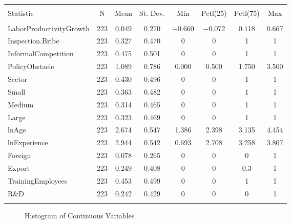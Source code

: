 \begin{table}[!htbp] \centering 
  \caption*{}  
\begin{tabular}{@{\extracolsep{5pt}}lccccccc} 
\\[-1.8ex]\hline 
\hline \\[-1.8ex] 
Statistic & \multicolumn{1}{c}{N} & \multicolumn{1}{c}{Mean} & \multicolumn{1}{c}{St. Dev.} & \multicolumn{1}{c}{Min} & \multicolumn{1}{c}{Pctl(25)} & \multicolumn{1}{c}{Pctl(75)} & \multicolumn{1}{c}{Max} \\ 
\hline \\[-1.8ex] 
LaborProductivityGrowth & 223 & 0.049 & 0.270 & $-$0.660 & $-$0.072 & 0.118 & 0.667 \\ 
Inspection.Bribe & 223 & 0.327 & 0.470 & 0 & 0 & 1 & 1 \\ 
InformalCompetition & 223 & 0.475 & 0.501 & 0 & 0 & 1 & 1 \\ 
PolicyObstacle & 223 & 1.089 & 0.786 & 0.000 & 0.500 & 1.750 & 3.500 \\ 
Sector & 223 & 0.430 & 0.496 & 0 & 0 & 1 & 1 \\ 
Small & 223 & 0.363 & 0.482 & 0 & 0 & 1 & 1 \\ 
Medium & 223 & 0.314 & 0.465 & 0 & 0 & 1 & 1 \\ 
Large & 223 & 0.323 & 0.469 & 0 & 0 & 1 & 1 \\ 
lnAge & 223 & 2.674 & 0.547 & 1.386 & 2.398 & 3.135 & 4.454 \\ 
lnExperience & 223 & 2.944 & 0.542 & 0.693 & 2.708 & 3.258 & 3.807 \\ 
Foreign & 223 & 0.078 & 0.265 & 0 & 0 & 0 & 1 \\ 
Export & 223 & 0.249 & 0.408 & 0 & 0 & 0.3 & 1 \\ 
TrainingEmployees & 223 & 0.453 & 0.499 & 0 & 0 & 1 & 1 \\ 
R\&D & 223 & 0.242 & 0.429 & 0 & 0 & 0 & 1 \\ 
\hline \\[-1.8ex] 
\end{tabular} 
\end{table} 

\begin{figure}[H]%
    \centering
    \begin{subfigure}
    \texttt{[image: chinchilab-template/Pictures/Model3.3\_hist\_a.png]}
    \end{subfigure}
    \begin{subfigure}
    \texttt{[image: chinchilab-template/Pictures/Model3.3\_hist\_b.png]}
    \end{subfigure}
    \begin{subfigure}
    \texttt{[image: chinchilab-template/Pictures/Model3.3\_hist\_c.png]}
    \end{subfigure}
    \begin{subfigure}
    \texttt{[image: chinchilab-template/Pictures/Model3.3\_hist\_d.png]}
    \end{subfigure}
    \caption*{Histogram of Continuous Variables}%
\end{figure}

